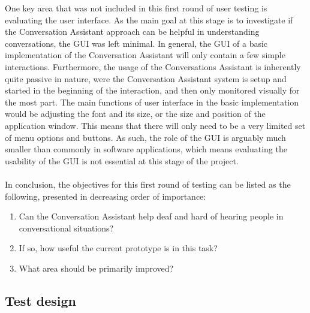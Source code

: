 \documentclass[english, 12pt, a4paper, pdftex, elec, utf8]{aaltothesis}
\begin{document}
One key area that was not included in this first round of user testing is evaluating the user interface. As the main goal at this stage is to investigate if the Conversation Assistant approach can be helpful in understanding conversations, the GUI was left minimal. In general, the GUI of a basic implementation of the Conversation Assistant will only contain a few simple interactions. Furthermore, the usage of the Conversations Assistant is inherently quite passive in nature, were the Conversation Assistant system is setup and started in the beginning of the interaction, and then only monitored visually for the most part. The main functions of user interface in the basic implementation would be adjusting the font and its size, or the size and position of the application window. This means that there will only need to be a very limited set of menu options and buttons. As such, the role of the GUI is arguably much smaller than commonly in software applications, which means evaluating the usability of the GUI is not essential at this stage of the project. \\\\
In conclusion, the objectives for this first round of testing can be listed as the following, presented in decreasing order of importance:
\vspace{1mm}
\begin{enumerate}[itemsep=2mm]
	\item Can the Conversation Assistant help deaf and hard of hearing people in conversational situations?
	\item If so, how useful the current prototype is in this task?
	\item What area should be primarily improved?
\end{enumerate}
\vspace{1mm}

\subsection{Test design} \label{sec:testdesign}
\end{document}
